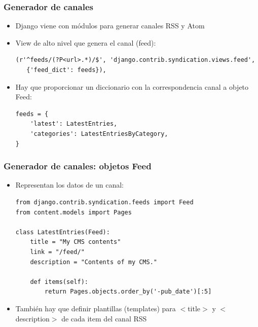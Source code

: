 
\begin{frame}[fragile]
\frametitle{Generador de canales}

\begin{itemize}
\item Django viene con módulos para generar canales RSS y Atom
\item View de alto nivel que genera el canal (feed):

\begin{verbatim}
(r'^feeds/(?P<url>.*)/$', 'django.contrib.syndication.views.feed',
   {'feed_dict': feeds}),
\end{verbatim}

\item Hay que proporcionar un diccionario con la correspondencia canal a objeto Feed:

\begin{verbatim}
feeds = {
    'latest': LatestEntries,
    'categories': LatestEntriesByCategory,
}
\end{verbatim}
\end{itemize}

\end{frame}


\begin{frame}[fragile]
\frametitle{Generador de canales: objetos Feed}

\begin{itemize}
\item Representan los datos de un canal:

\begin{verbatim}
from django.contrib.syndication.feeds import Feed
from content.models import Pages

class LatestEntries(Feed):
    title = "My CMS contents"
    link = "/feed/"
    description = "Contents of my CMS."

    def items(self):
        return Pages.objects.order_by('-pub_date')[:5]
\end{verbatim}

\item También hay que definir plantillas (templates) para $<$title$>$ y $<$description$>$ de cada item del canal RSS
\end{itemize}

\end{frame}

